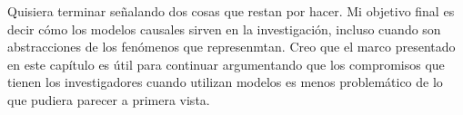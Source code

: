 Quisiera terminar señalando dos cosas que restan por hacer. 
Mi objetivo final es decir cómo los modelos causales sirven en la investigación, incluso cuando son abstracciones de los fenómenos que represenmtan.
Creo que el marco presentado en este capítulo es útil para continuar argumentando que los compromisos que tienen los investigadores cuando utilizan modelos es menos problemático de lo que pudiera parecer a primera vista.
